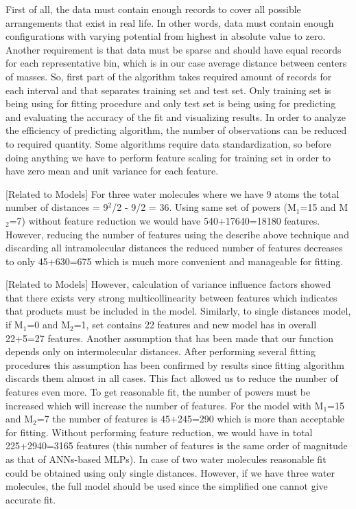\documentclass[aps,prl,reprint,amsmath,amssymb,nature]{revtex4-1}
\begin{document}
First of all, the data must contain enough records to cover all possible arrangements that exist in real life. 
In other words, data must contain enough configurations with varying potential from highest in absolute value to zero. 
Another requirement is that data must be sparse and should have equal records for each representative bin, which is in our 
case average distance between centers of masses. 
So, first part of the algorithm takes required amount of records for each interval and that separates training set and test set. 
Only training set is being using for fitting procedure and only test set is being using for predicting and evaluating the accuracy of the fit and visualizing results. 
In order to analyze the efficiency of predicting algorithm, the number of observations can be reduced to required quantity. 
Some algorithms require data standardization, so before doing anything we have to perform feature scaling for training set in order to have zero mean and unit variance for each feature.

[Related to Models] For three water molecules where we have 9 atoms the total number of 
distances = 9$^{2}$/2 - 9/2 = 36. Using same set of powers (M$_{1
}$=15 and M$_{2}$=7) without feature reduction we would have 
540+17640=18180 features. However, reducing the number of features using 
the describe above technique and discarding all intramolecular distances 
the reduced number of features decreases to only 45+630=675 which is 
much more convenient and manageable for fitting.

[Related to Models] However, calculation of variance influence factors showed that there 
exists very strong multicollinearity between features which indicates 
that products must be included in the model. Similarly, to single 
distances model, if M$_{1}$=0 and M$_{2}$=1, set contains 22 
features and new model has in overall 22+5=27 features. Another 
assumption that has been made that our function depends only on 
intermolecular distances. After performing several fitting procedures 
this assumption has been confirmed by results since fitting algorithm 
discards them almost in all cases. This fact allowed us to reduce the 
number of features even more. To get reasonable fit, the number of 
powers must be increased which will increase the number of features. For 
the model with M$_{1}$=15 and M$_{2}$=7 the number of features 
is 45+245=290 which is more than acceptable for fitting. Without 
performing feature reduction, we would have in total 225+2940=3165 
features (this number of features is the same order of magnitude as that 
of ANNs-based MLPs). In case of two water molecules reasonable fit could 
be obtained using only single distances. However, if we have three water 
molecules, the full model should be used since the simplified one cannot 
give accurate fit. 
\end{document}
